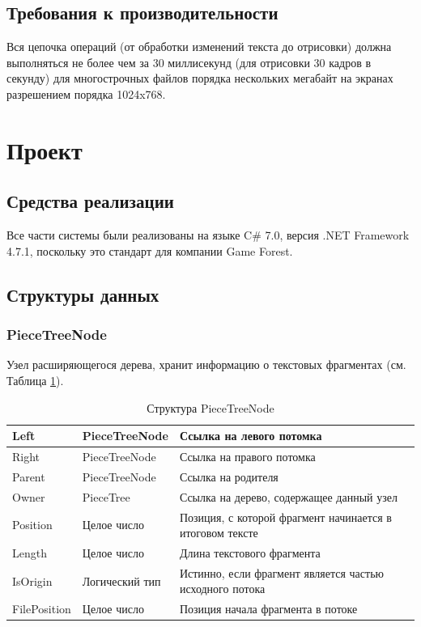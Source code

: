 \documentclass{fefu}
\begin{document}
		\subsection{Требования к производительности}
			Вся цепочка операций (от обработки изменений текста до 
			отрисовки) должна выполняться не более чем за 30 миллисекунд (для отрисовки 30 
			кадров в секунду) для многострочных файлов порядка нескольких мегабайт на экранах
			разрешением порядка 1024x768. %
	\section{Проект}
		\subsection{Средства реализации}
			Все части системы были реализованы на языке C\# 7.0, 
			версия .NET Framework 4.7.1, поскольку это стандарт для компании Game Forest.
		\subsection{Структуры данных}
			\subsubsection{PieceTreeNode}
				\par Узел расширяющегося дерева, хранит информацию о 
				текстовых фрагментах (см. Таблица \ref{table:PieceTreeNode}).
				\begin{table}[h]
					\centering
					\begin{tabular}{|l|l|p{10cm}|}
						\hline
						Left & PieceTreeNode & Ссылка на левого потомка\\
						\hline
						Right & PieceTreeNode & Ссылка на правого потомка \\
						\hline
						Parent & PieceTreeNode & Ссылка на родителя \\
						\hline
						Owner & PieceTree & Ссылка на дерево, содержащее данный узел \\
						\hline
						Position & Целое число & Позиция, с которой фрагмент начинается в 
						итоговом тексте \\
						\hline
						Length & Целое число & Длина текстового фрагмента \\
						\hline
						IsOrigin & Логический тип & Истинно, если фрагмент является частью 
						исходного потока \\
						\hline
						FilePosition & Целое число & Позиция начала фрагмента в потоке \\
						\hline
					\end{tabular}
					\caption{Структура PieceTreeNode}
					\label{table:PieceTreeNode}
				\end{table}
\end{document}
